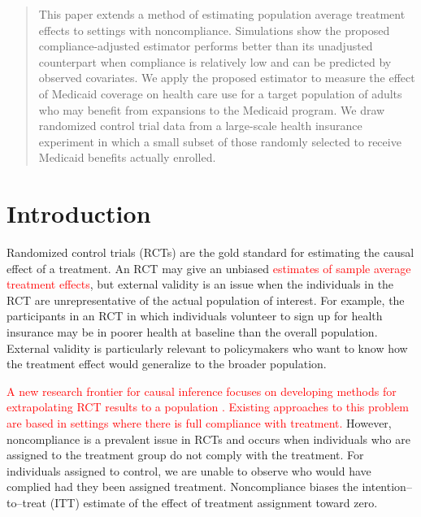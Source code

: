 \documentclass[hidelinks,12pt]{article}
\begin{document}
\begin{singlespace} %
\maketitle  
\end{singlespace}

\thispagestyle{empty}
\begin{abstract}  
\noindent 
This paper extends a method of estimating population average treatment effects to settings with noncompliance. Simulations show the proposed compliance-adjusted estimator performs better than its unadjusted counterpart when compliance is relatively low and can be predicted by observed covariates. We apply the proposed estimator to measure the effect of Medicaid coverage on health care use for a target population of adults who may benefit from expansions to the Medicaid program. We draw randomized control trial data from a large-scale health insurance experiment in which a small subset of those randomly selected to receive Medicaid benefits actually enrolled.
\end{abstract}	

\pagebreak
\setcounter{page}{1} %

\vspace{20mm}

\section{Introduction}\label{intro}
Randomized control trials (RCTs) are the gold standard for estimating the causal effect of a treatment. An RCT may give an unbiased \textcolor{red}{estimates of sample average treatment effects}, but external validity is an issue when the individuals in the RCT are unrepresentative of the actual population of interest. For example, the participants in an RCT in which individuals volunteer to sign up for health insurance may be in poorer health at baseline than the overall population. External validity is particularly relevant to policymakers who want to know how the treatment effect would generalize to the broader population. 

\textcolor{red}{A new research frontier for causal inference focuses on developing methods for extrapolating RCT results to a population \citep[e.g.,][]{ImaKinStu08}. Existing approaches to this problem are based in settings where there is full compliance with treatment.} However, noncompliance is a prevalent issue in RCTs and occurs when individuals who are assigned to the treatment group do not comply with the treatment. For individuals assigned to control, we are unable to observe who would have complied had they been assigned treatment. Noncompliance biases the intention--to--treat (ITT) estimate of the effect of treatment assignment toward zero.
\end{document}

